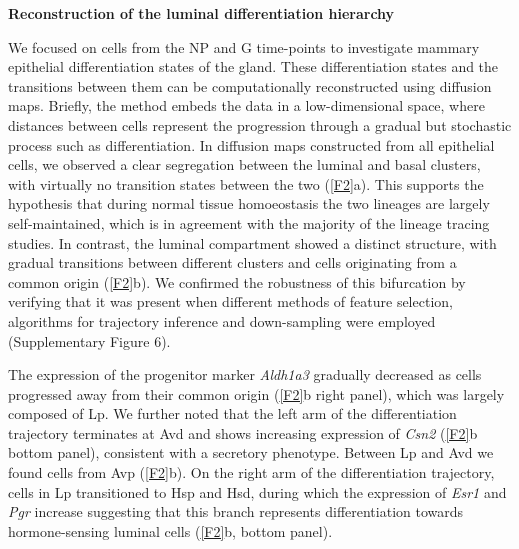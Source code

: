 \documentclass[titlepage, 12pt, oneside]{amsart}
\begin{document}
\textbf{Reconstruction of the luminal differentiation hierarchy}

We focused on cells from the NP and G time-points to investigate mammary epithelial differentiation states of the gland.
These differentiation states and the transitions between them can be computationally reconstructed using diffusion maps.
Briefly, the method embeds the data in a low-dimensional space, where distances between cells represent the progression through a gradual but stochastic process such as differentiation.
In diffusion maps constructed from all epithelial cells, we observed a clear segregation between the luminal and basal clusters, with virtually no transition states between the two (\autoref{F2}a).
This supports the hypothesis that during normal tissue homoeostasis the two lineages are largely self-maintained, which is in agreement with the majority of the lineage tracing studies\autocite{VanKeymeulen2011,VanAmerongen2012,Davis2016}.
In contrast, the luminal compartment showed a distinct structure, with gradual transitions between different clusters and cells originating from a common origin (\autoref{F2}b).
We confirmed the robustness of this bifurcation by verifying that it was present when different methods of feature selection, algorithms for trajectory inference and down-sampling were employed (Supplementary Figure 6).

The expression of the progenitor marker \textit{Aldh1a3} gradually decreased as cells progressed away from their common origin (\autoref{F2}b right panel), which was largely composed of Lp.
We further noted that the left arm of the differentiation trajectory terminates at Avd and shows increasing expression of \textit{Csn2} (\autoref{F2}b bottom panel), consistent with a secretory phenotype.
Between Lp and Avd we found cells from Avp (\autoref{F2}b).
On the right arm of the differentiation trajectory, cells in Lp transitioned to Hsp and Hsd, during which the expression of \textit{Esr1} and \textit{Pgr} increase suggesting that this branch represents differentiation towards hormone-sensing luminal cells (\autoref{F2}b, bottom panel).
\end{document}
